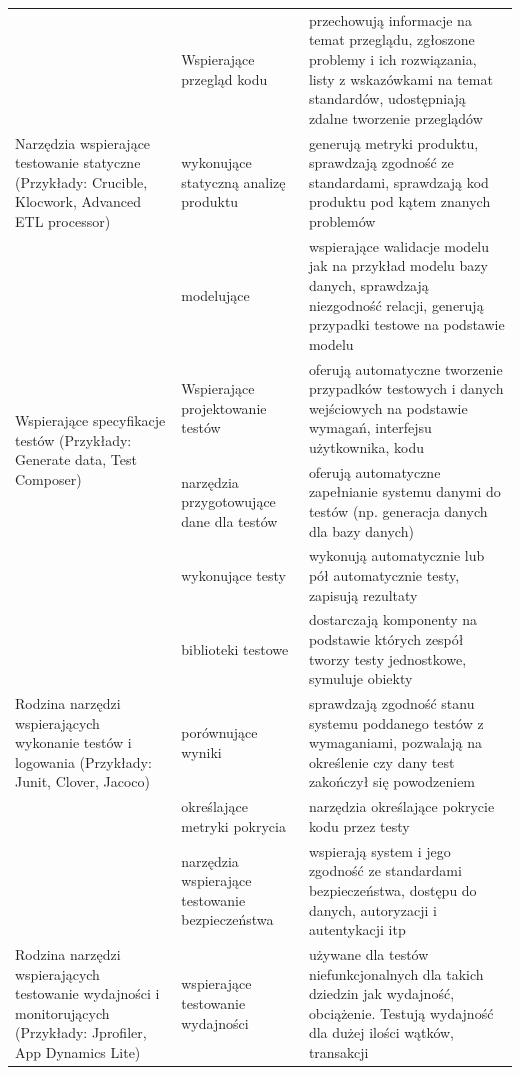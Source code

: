 \begin{longtable}{| p{4cm} | p{4cm} | p{8cm} |}
\multirow{3}{4cm}{Narzędzia wspierające testowanie statyczne (Przykłady: Crucible\cite{crucible}, Klocwork\cite{klocwork}, Advanced ETL processor\cite{etlProcessor})} &
Wspierające przegląd kodu & przechowują informacje na temat przeglądu, zgłoszone problemy i ich rozwiązania, listy z wskazówkami na temat standardów, udostępniają zdalne tworzenie przeglądów\\ \cline{2-3}
& wykonujące statyczną analizę produktu & generują metryki produktu, sprawdzają zgodność ze standardami, sprawdzają kod produktu pod kątem znanych problemów\\ \cline{2-3}
&  modelujące  & wspierające walidacje modelu jak na przykład modelu bazy danych, sprawdzają niezgodność relacji, generują przypadki testowe na podstawie modelu\\ \hline
\hline
\multirow{2}{4cm}{Wspierające specyfikacje testów (Przykłady: Generate data\cite{generateData}, Test Composer\cite{testComposer})} &
Wspierające projektowanie testów & oferują automatyczne tworzenie przypadków testowych i danych wejściowych na podstawie wymagań, interfejsu użytkownika, kodu\\ \cline{2-3}
& narzędzia przygotowujące dane dla testów & oferują automatyczne zapełnianie systemu danymi do testów (np. generacja danych dla bazy danych)\\ \cline{2-3}
\hline
\multirow{5}{4cm}{Rodzina narzędzi wspierających wykonanie testów i logowania (Przykłady: Junit\cite{junit}, Clover\cite{clover}, Jacoco\cite{jacoco})} &
wykonujące testy & wykonują automatycznie lub pół automatycznie testy, zapisują rezultaty\\ \cline{2-3}
& biblioteki testowe & dostarczają komponenty na podstawie których zespół tworzy testy jednostkowe, symuluje obiekty\\ \cline{2-3}
&  porównujące wyniki & sprawdzają zgodność stanu systemu poddanego testów z wymaganiami, pozwalają na określenie czy dany test zakończył się powodzeniem\\ \cline{2-3}
& określające metryki pokrycia & narzędzia określające pokrycie kodu przez testy \\ \cline{2-3}
& narzędzia wspierające testowanie bezpieczeństwa & wspierają system i jego zgodność ze standardami bezpieczeństwa, dostępu do danych, autoryzacji i autentykacji itp\\ \hline
\hline
\multirow{5}{4cm}{Rodzina narzędzi wspierających testowanie wydajności i monitorujących (Przykłady: Jprofiler\cite{jprofiler}, App Dynamics Lite\cite{appdynamic})}&
 wspierające testowanie wydajności & używane dla testów niefunkcjonalnych dla takich dziedzin jak wydajność, obciążenie. Testują wydajność dla dużej ilości wątków, transakcji \\ \cline{2-3}

\end{longtable}
